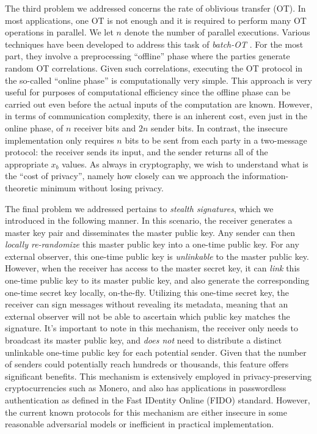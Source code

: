 The third problem we addressed concerns the rate of oblivious transfer (OT).  In most applications, one OT is not enough and it is required to perform many OT operations in parallel.
We let $n$ denote the number of parallel executions. Various techniques have been developed to address this task of \emph{batch-OT} \cite{C:IKNP03,C:BCGIKS19,CCS:BCGIKRS19}. For the most part, they involve a preprocessing ``offline'' phase where the parties generate random OT correlations. Given such correlations, executing the OT protocol in the so-called ``online phase'' is computationally very simple. This approach is very useful for purposes of computational efficiency since the offline phase can be carried out even before the actual inputs of the computation are known. However, in terms of communication complexity, there is an inherent cost, even just in the online phase, of $n$ receiver bits and $2n$ sender bits. In contrast, the insecure implementation only requires $n$ bits to be sent from each party in a two-message protocol: the receiver sends its input, and the sender returns all of the appropriate $x_b$ values. As always in cryptography, we wish to understand what is the ``cost of privacy'', namely how closely can we approach the information-theoretic minimum without losing privacy. 

The final problem we addressed pertains to \emph{stealth signatures}, which we introduced in the following manner.
In this scenario, the receiver generates a master key pair and disseminates the master public key. Any sender can then \emph{locally re-randomize} this master public key into a one-time public key. For any external observer, this one-time public key is \emph{unlinkable} to the master public key. However, when the receiver has access to the master secret key, it can \emph{link} this one-time public key to its master public key, and also generate the corresponding one-time secret key locally, on-the-fly. Utilizing this one-time secret key, the receiver can sign messages without revealing its metadata, meaning that an external observer will not be able to ascertain which public key matches the signature.
It's important to note in this mechanism, the receiver only needs to broadcast its master public key, and \emph{does not} need to distribute a distinct unlinkable one-time public key for each potential sender. Given that the number of senders could potentially reach hundreds or thousands, this feature offers significant benefits. This mechanism is extensively employed in privacy-preserving cryptocurrencies such as Monero, and also has applications in passwordless authentication as defined in the Fast IDentity Online (FIDO) standard.
However, the current known protocols for this mechanism are either insecure in some reasonable adversarial models or inefficient in practical implementation.

